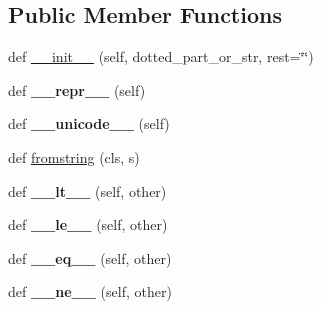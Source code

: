 \subsection*{Public Member Functions}
\begin{DoxyCompactItemize}
\item 
def \hyperlink{class_libraries_1_1dialog_1_1_dialog_backend_version_af42bd1dbb2a057c8a4f4ef80b258aa68}{\+\_\+\+\_\+init\+\_\+\+\_\+} (self, dotted\+\_\+part\+\_\+or\+\_\+str, rest=\char`\"{}\char`\"{})
\item 
def {\bfseries \+\_\+\+\_\+repr\+\_\+\+\_\+} (self)\hypertarget{class_libraries_1_1dialog_1_1_dialog_backend_version_a2a968b7eddbac59959ba702ef8aaeded}{}\label{class_libraries_1_1dialog_1_1_dialog_backend_version_a2a968b7eddbac59959ba702ef8aaeded}

\item 
def {\bfseries \+\_\+\+\_\+unicode\+\_\+\+\_\+} (self)\hypertarget{class_libraries_1_1dialog_1_1_dialog_backend_version_ab94aba5a18a677d48a43bd729636493d}{}\label{class_libraries_1_1dialog_1_1_dialog_backend_version_ab94aba5a18a677d48a43bd729636493d}

\item 
def \hyperlink{class_libraries_1_1dialog_1_1_dialog_backend_version_a667f1355cb1a0d39a10a091b1c761b66}{fromstring} (cls, s)
\item 
def {\bfseries \+\_\+\+\_\+lt\+\_\+\+\_\+} (self, other)\hypertarget{class_libraries_1_1dialog_1_1_dialog_backend_version_ac9a6f3fb93d038065c20faec2c04abe5}{}\label{class_libraries_1_1dialog_1_1_dialog_backend_version_ac9a6f3fb93d038065c20faec2c04abe5}

\item 
def {\bfseries \+\_\+\+\_\+le\+\_\+\+\_\+} (self, other)\hypertarget{class_libraries_1_1dialog_1_1_dialog_backend_version_aa4293c8ae7bacb765a558975b1927341}{}\label{class_libraries_1_1dialog_1_1_dialog_backend_version_aa4293c8ae7bacb765a558975b1927341}

\item 
def {\bfseries \+\_\+\+\_\+eq\+\_\+\+\_\+} (self, other)\hypertarget{class_libraries_1_1dialog_1_1_dialog_backend_version_a58509aaedc21ba32675672b001ab852a}{}\label{class_libraries_1_1dialog_1_1_dialog_backend_version_a58509aaedc21ba32675672b001ab852a}

\item 
def {\bfseries \+\_\+\+\_\+ne\+\_\+\+\_\+} (self, other)\hypertarget{class_libraries_1_1dialog_1_1_dialog_backend_version_aa3b922832aaa7f8a790a3253fea46301}{}\label{class_libraries_1_1dialog_1_1_dialog_backend_version_aa3b922832aaa7f8a790a3253fea46301}


\end{DoxyCompactItemize}
